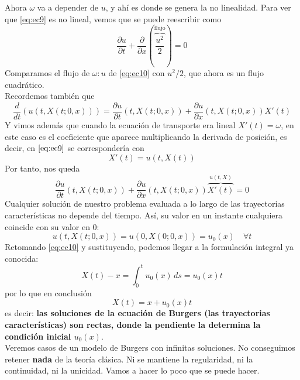 \begin{observacion}
    Ahora $\omega$ va a depender de $u$, y ahí es donde se genera la no linealidad. Para ver que \eqref{eq:ec9} es no lineal, vemos que se puede reescribir como
    \begin{equation}
        \dfrac{\partial u}{\partial t} + \dfrac{\partial}{\partial x} \left( \overbrace{\dfrac{u^2}{2}}^{\text{flujo}} \right) = 0
    \end{equation}
    Comparamos el flujo de $\omega : u$ de \eqref{eq:ec10} con $u^2/2$, que ahora es un flujo cuadrático. \\

    Recordemos también que 
    $$\dfrac{d}{dt}(u(t,X(t;0,x))) = \dfrac{\partial u}{\partial t}(t,X(t;0,x)) + \dfrac{\partial u}{\partial x}(t,X(t;0,x))X'(t)$$
    Y vimos además que cuando la ecuación de transporte era lineal $X'(t) = \omega$, en este caso es el coeficiente que aparece multiplicando la derivada de posición, 
    es decir, en $\eqref{eq:ec9}$ se correspondería con 
    \begin{equation}\label{eq:ec11}
        X'(t) = u(t,X(t)) 
    \end{equation}
    Por tanto, nos queda
    $$\dfrac{\partial u}{\partial t}(t,X(t;0,x)) + \dfrac{\partial u}{\partial x}(t,X(t;0,x))\overbrace{X'(t)}^{u(t,X)} = 0$$
    Cualquier solución de nuestro problema evaluada a lo largo de las trayectorias características no depende del tiempo. Así, su valor en un instante cualquiera
    coincide con su valor en $0$:
    \begin{equation}\label{eq:ec12}
        u(t,X(t;0,x)) = u(0,X(0;0,x)) = u_0(x) \quad \forall t
    \end{equation}
    Retomando \eqref{eq:ec10} y sustituyendo, podemos llegar a la formulación integral ya conocida:
    $$X(t) - x = \int_0^t u_0(x)\,ds = u_0(x) t$$
    por lo que en conclusión
    \begin{equation}\label{eq:ec17}
        X(t) = x + u_0(x)t
    \end{equation}
    es decir: \textbf{las soluciones de la ecuación de Burgers (las trayectorias características) son rectas, donde la pendiente la determina la condición inicial $u_0(x)$}. \\

    Veremos casos de un modelo de Burgers con infinitas soluciones. No conseguimos retener \textbf{nada} de la teoría clásica. Ni se mantiene la regularidad, ni la continuidad, ni la
    unicidad. Vamos a hacer lo poco que se puede hacer.
\end{observacion}

